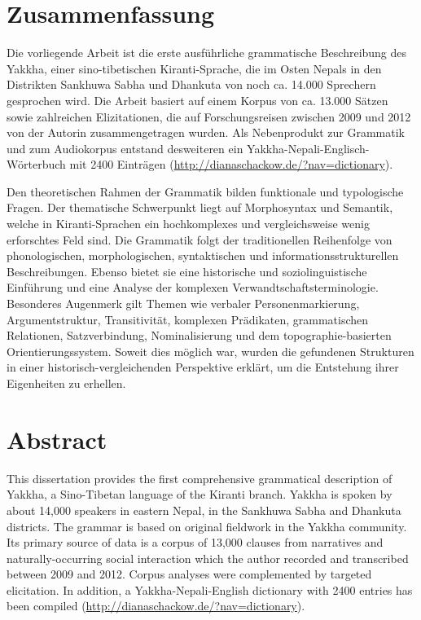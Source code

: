 \documentclass[a4paper, 12pt, bibliography=totoc, headsepline]{scrartcl}
\begin{document}
\section*{Zusammenfassung}

Die vorliegende Arbeit ist die erste ausführliche grammatische Beschreibung des Yakkha, einer sino-tibetischen Kiranti-Sprache, die im Osten Nepals in den Distrikten Sankhuwa Sabha und Dhankuta von noch ca. 14.000 Sprechern gesprochen wird. Die Arbeit basiert auf einem Korpus von ca. 13.000 Sätzen sowie zahlreichen Elizitationen, die auf Forschungsreisen zwischen 2009 und 2012 von der Autorin zusammengetragen wurden. Als Nebenprodukt zur Grammatik und zum Audiokorpus entstand  desweiteren ein Yakkha-Nepali-Englisch-Wörterbuch mit 2400 Einträgen (\url{http://dianaschackow.de/?nav=dictionary}).

Den theoretischen Rahmen der Grammatik bilden funktionale und typologische Fragen. Der thematische Schwerpunkt liegt auf Morphosyntax und Semantik, welche in Kiranti-Sprachen ein hochkomplexes und vergleichsweise wenig erforschtes Feld sind. Die Grammatik folgt der traditionellen Reihenfolge von phonologischen, morphologischen, syntaktischen und informationsstrukturellen Beschreibungen. Ebenso bietet sie eine historische und soziolinguistische Einführung und eine Analyse der komplexen Verwandtschaftsterminologie. Besonderes Augenmerk gilt Themen wie verbaler Personenmarkierung, Argumentstruktur, Transitivität, komplexen Prädikaten, grammatischen Relationen, Satzverbindung, Nominalisierung und dem topographie-basierten Orientierungssystem. Soweit dies möglich war, wurden die gefundenen Strukturen in einer historisch-vergleichenden Perspektive erklärt, um die Entstehung ihrer Eigenheiten zu erhellen. 


\section*{Abstract}


This dissertation provides the first comprehensive grammatical  description of Yakkha, a Sino-Tibetan language of the Kiranti branch. Yakkha is spoken by about 14,000 speakers in eastern Nepal, in the
Sankhuwa Sabha and Dhankuta districts. The grammar is based on original fieldwork in the Yakkha community. Its primary source of data is a corpus of 13,000 clauses from narratives and naturally-occurring social interaction which the author recorded and transcribed between 2009 and 2012. Corpus analyses were complemented by targeted elicitation. In addition, a Yakkha-Nepali-English dictionary with 2400 entries has been compiled (\url{http://dianaschackow.de/?nav=dictionary}).
\end{document}

